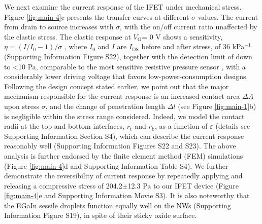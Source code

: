 We next examine the current response of the IFET under mechanical
stress. Figure \ref{fig:main-4}c presents the transfer curves at
different \(\sigma\) values. The current from drain to source
increases with \(\sigma\), with the on/off current ratio unaffected by
the elastic stress. The elastic response at \(V_{\mathrm{G}}\)= 0 V
shows a sensitivity, \(\eta = (I/I_{0} - 1) / \sigma\) , where
\(I_{0}\) and \(I\) are \(I_{\mathrm{DS}}\) before and after stress,
of 36 kPa\(^{-1}\) (Supporting Information Figure S22), together
with the detection limit of down to \textless{}10 Pa, comparable to the
most sensitive resistive pressure sensor
\cite{Mannsfeld_2010,Pang_2012,Pan_2014,Zang_2015}, with a
considerably lower driving voltage that favors low-power-consumption
designs. Following the design concept stated earlier, we point out
that the major mechanism responsible for the current response is an
increased contact area \(\Delta A\) upon stress \(\sigma\), and the
change of penetration length \(\Delta l\) (see Figure \ref{fig:main-1}b)
is negligible within the stress range considered. Indeed, we model
the contact radii at the top and bottom interfaces, \(r_{\mathrm{t}}\)
and \(r_{\mathrm{b}}\), as a function of \(\varepsilon\) (details see
Supporting Information Section S4), which can describe the current
response reasonably well (Supporting Information Figures S22 and
S23). The above analysis is further endorsed by the finite element
method (FEM) simulations (Figure \ref{fig:main-4}d and Supporting Information Table S4).  We further demonstrate the reversibility
of current response by repeatedly applying and releasing a
compressive stress of 204.2\(\pm\)12.3 Pa to our IFET device (Figure
\ref{fig:main-4}e and Supporting Information Movie S3). It is also
noteworthy that the EGaIn sessile droplets function equally well on
the NWs (Supporting Information Figure S19), in spite of their
sticky oxide surface.

